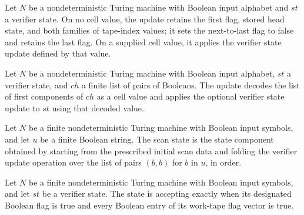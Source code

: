 \begin{definition}
\label{Complexity.Codec.vStepO}
\leanok
{}
Let $N$ be a nondeterministic Turing machine with Boolean input alphabet and $st$ a
verifier state. On no cell value, the update retains the first flag, stored head state,
and both families of tape-index values; it sets the next-to-last flag to false and
retains the last flag. On a supplied cell value, it applies the verifier state update
defined by that value.
\end{definition}

\begin{definition}
\label{Complexity.Codec.vChunk}
\leanok
{}
Let $N$ be a nondeterministic Turing machine with Boolean input alphabet, $st$ a
verifier state, and $ch$ a finite list of pairs of Booleans. The update decodes the list
of first components of $ch$ as a cell value and applies the optional verifier state
update to $st$ using that decoded value.
\end{definition}

\begin{definition}
\label{Complexity.Codec.vScan}
\leanok
{}
Let $N$ be a finite nondeterministic Turing machine with Boolean input symbols, and let
$u$ be a finite Boolean string. The scan state is the state component obtained by
starting from the prescribed initial scan data and folding the verifier update operation
over the list of pairs $(b,b)$ for $b$ in $u$, in order.
\end{definition}

\begin{definition}
\label{Complexity.Codec.VAcc}
\leanok
{}
Let $N$ be a finite nondeterministic Turing machine with Boolean input symbols, and let
$st$ be a verifier state. The state is accepting exactly when its designated Boolean
flag is true and every Boolean entry of its work-tape flag vector is true.
\end{definition}

